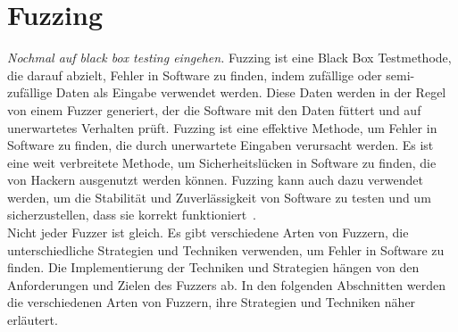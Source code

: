 
\section{Fuzzing}\label{sec:fuzzing}
\textit{Nochmal auf black box testing eingehen.}
Fuzzing ist eine Black Box Testmethode, die darauf abzielt, Fehler in Software zu finden, indem zufällige oder semi-zufällige Daten als Eingabe verwendet werden.
Diese Daten werden in der Regel von einem Fuzzer generiert, der die Software mit den Daten füttert und auf unerwartetes Verhalten prüft.
Fuzzing ist eine effektive Methode, um Fehler in Software zu finden, die durch unerwartete Eingaben verursacht werden.
Es ist eine weit verbreitete Methode, um Sicherheitslücken in Software zu finden, die von Hackern ausgenutzt werden können.
Fuzzing kann auch dazu verwendet werden, um die Stabilität und Zuverlässigkeit von Software zu testen und um sicherzustellen, dass sie korrekt funktioniert~\cite{fuzzing}. \\
Nicht jeder Fuzzer ist gleich.
Es gibt verschiedene Arten von Fuzzern, die unterschiedliche Strategien und Techniken verwenden, um Fehler in Software zu finden.
Die Implementierung der Techniken und Strategien hängen von den Anforderungen und Zielen des Fuzzers ab.
In den folgenden Abschnitten werden die verschiedenen Arten von Fuzzern, ihre Strategien und Techniken näher erläutert.






